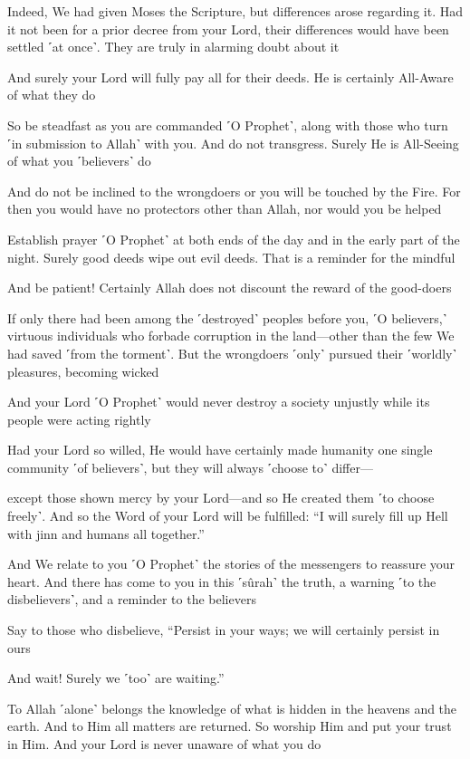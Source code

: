 Indeed, We had given Moses the Scripture, but differences arose regarding it. Had it not been for a prior decree from your Lord, their differences would have been settled ˹at once˺. They are truly in alarming doubt about it

And surely your Lord will fully pay all for their deeds. He is certainly All-Aware of what they do

So be steadfast as you are commanded ˹O Prophet˺, along with those who turn ˹in submission to Allah˺ with you. And do not transgress. Surely He is All-Seeing of what you ˹believers˺ do

And do not be inclined to the wrongdoers or you will be touched by the Fire. For then you would have no protectors other than Allah, nor would you be helped

Establish prayer ˹O Prophet˺ at both ends of the day and in the early part of the night. Surely good deeds wipe out evil deeds. That is a reminder for the mindful

And be patient! Certainly Allah does not discount the reward of the good-doers

If only there had been among the ˹destroyed˺ peoples before you, ˹O believers,˺ virtuous individuals who forbade corruption in the land—other than the few We had saved ˹from the torment˺. But the wrongdoers ˹only˺ pursued their ˹worldly˺ pleasures, becoming wicked

And your Lord ˹O Prophet˺ would never destroy a society unjustly while its people were acting rightly

Had your Lord so willed, He would have certainly made humanity one single community ˹of believers˺, but they will always ˹choose to˺ differ—

except those shown mercy by your Lord—and so He created them ˹to choose freely˺. And so the Word of your Lord will be fulfilled: “I will surely fill up Hell with jinn and humans all together.”

And We relate to you ˹O Prophet˺ the stories of the messengers to reassure your heart. And there has come to you in this ˹sûrah˺ the truth, a warning ˹to the disbelievers˺, and a reminder to the believers

Say to those who disbelieve, “Persist in your ways; we will certainly persist in ours

And wait! Surely we ˹too˺ are waiting.”

To Allah ˹alone˺ belongs the knowledge of what is hidden in the heavens and the earth. And to Him all matters are returned. So worship Him and put your trust in Him. And your Lord is never unaware of what you do

